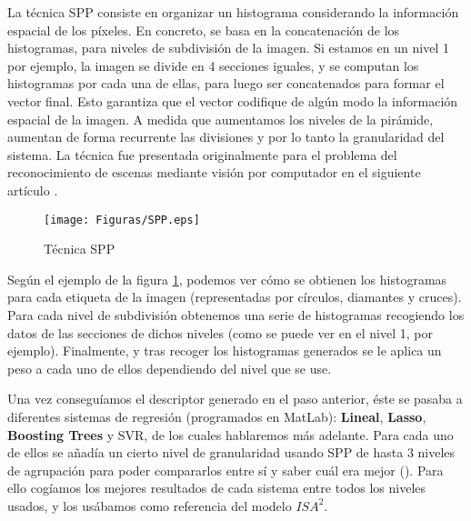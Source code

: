 La técnica \ac{SPP} consiste en organizar un histograma considerando la información espacial de los píxeles. En concreto, se basa en la concatenación de los histogramas, para niveles de subdivisión de la imagen. Si estamos en un nivel 1 por ejemplo, la imagen se divide en 4 secciones iguales, y se computan los histogramas por cada una de ellas, para luego ser concatenados para formar el vector final. Esto garantiza que el vector codifique de algún modo la información espacial de la imagen. A medida que aumentamos los niveles de la pirámide, aumentan de forma recurrente las divisiones y por lo tanto la granularidad del sistema. La técnica fue presentada originalmente para el problema del reconocimiento de escenas mediante visión por computador en el siguiente artículo \cite{spp_real}.

\begin{figure}[H]
\centering
\texttt{[image: Figuras/SPP.eps]}
\caption{Técnica \ac{SPP}}
\label{fig:spp2}
\end{figure}

Según el ejemplo de la figura \ref{fig:spp2}, podemos ver cómo se obtienen los histogramas para cada etiqueta de la imagen (representadas por círculos, diamantes y cruces). Para cada nivel de subdivisión obtenemos una serie de histogramas recogiendo los datos de las secciones de dichos niveles (como se puede ver en el nivel 1, por ejemplo). Finalmente, y tras recoger los histogramas generados se le aplica un peso a cada uno de ellos dependiendo del nivel que se use.

Una vez conseguíamos el descriptor generado en el paso anterior, éste se pasaba a diferentes sistemas de regresión (programados en MatLab): \textbf{Lineal}, \textbf{Lasso}, \textbf{Boosting Trees} y \ac{SVR}, de los cuales hablaremos más adelante. Para cada uno de ellos se añadía un cierto nivel de granularidad usando \ac{SPP} de hasta 3 niveles de agrupación para poder compararlos entre sí y saber cuál era mejor (\cite{isa2}). Para ello cogíamos los mejores resultados de cada sistema entre todos los niveles usados, y los usábamos como referencia del modelo $ISA^{2}$.



